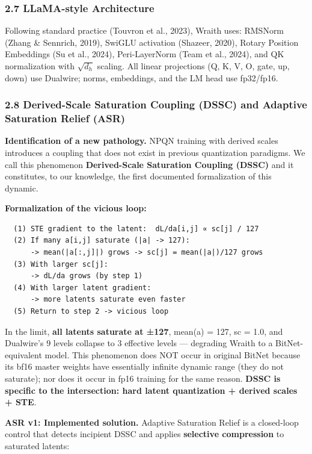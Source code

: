 \subsubsection{2.7 LLaMA-style
Architecture}\label{llama-style-architecture}

Following standard practice (Touvron et al., 2023), Wraith uses: RMSNorm
(Zhang \& Sennrich, 2019), SwiGLU activation (Shazeer, 2020), Rotary
Position Embeddings (Su et al., 2024), Peri-LayerNorm (Team et al.,
2024), and QK normalization with \(\sqrt{d_h}\) scaling. All linear
projections (Q, K, V, O, gate, up, down) use Dualwire; norms,
embeddings, and the LM head use fp32/fp16.

\subsubsection{2.8 Derived-Scale Saturation Coupling (DSSC) and Adaptive
Saturation Relief
(ASR)}\label{derived-scale-saturation-coupling-dssc-and-adaptive-saturation-relief-asr}

\textbf{Identification of a new pathology.} NPQN training with derived
scales introduces a coupling that does not exist in previous
quantization paradigms. We call this phenomenon \textbf{Derived-Scale
Saturation Coupling (DSSC)} and it constitutes, to our knowledge, the
first documented formalization of this dynamic.

\textbf{Formalization of the vicious loop:}

\begin{verbatim}
  (1) STE gradient to the latent:  dL/da[i,j] ∝ sc[j] / 127
  (2) If many a[i,j] saturate (|a| -> 127):
      -> mean(|a[:,j]|) grows -> sc[j] = mean(|a|)/127 grows
  (3) With larger sc[j]:
      -> dL/da grows (by step 1)
  (4) With larger latent gradient:
      -> more latents saturate even faster
  (5) Return to step 2 -> vicious loop
\end{verbatim}

In the limit, \textbf{all latents saturate at ±127},
mean(\textbar a\textbar) = 127, sc = 1.0, and Dualwire's 9 levels
collapse to 3 effective levels --- degrading Wraith to a
BitNet-equivalent model. This phenomenon does NOT occur in original
BitNet because its bf16 master weights have essentially infinite dynamic
range (they do not saturate); nor does it occur in fp16 training for the
same reason. \textbf{DSSC is specific to the intersection: hard latent
quantization + derived scales + STE}.

\textbf{ASR v1: Implemented solution.} Adaptive Saturation Relief is a
closed-loop control that detects incipient DSSC and applies
\textbf{selective compression} to saturated latents:

